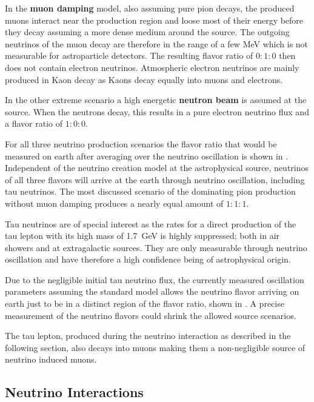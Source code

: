 In the \textbf{muon damping} model, also assuming pure pion decays, the produced muons interact near the production region and loose most of their energy before they decay assuming a more dense medium around the source.
The outgoing neutrinos of the muon decay are therefore in the range of a few MeV which is not measurable for astroparticle detectors.
The resulting flavor ratio of $0:1:0$ then does not contain electron neutrinos.
Atmospheric electron neutrinos are mainly produced in Kaon decay as Kaons decay equally into muons and electrons.

In the other extreme scenario a high energetic \textbf{neutron beam} is assumed at the source.
When the neutrons decay, this results in a pure electron neutrino flux and a flavor ratio of $1:0:0$.

For all three neutrino production scenarios the flavor ratio that would be measured on earth after averaging over the neutrino oscillation is shown in .
Independent of the neutrino creation model at the astrophysical source, neutrinos of all three flavors will arrive at the earth through neutrino oscillation, including tau neutrinos.
The most discussed scenario of the dominating pion production without muon damping produces a nearly equal amount of $1:1:1$.

Tau neutrinos are of special interest as the rates for a direct production of the tau lepton with its high mass of \SI{1.7}{GeV} is highly suppressed; both in air showers and at extragalactic sources.
They are only measurable through neutrino oscillation and have therefore a high confidence being of astrophysical origin.

Due to the negligible initial tau neutrino flux, the currently measured oscillation parameters assuming the standard model allows the neutrino flavor arriving on earth just to be in a distinct region of the flavor ratio, shown in .
A precise measurement of the neutrino flavors could shrink the allowed source scenarios.

The tau lepton, produced during the neutrino interaction as described in the following section, also decays into muons making them a non-negligible source of neutrino induced muons.

\subsection{Neutrino Interactions}

